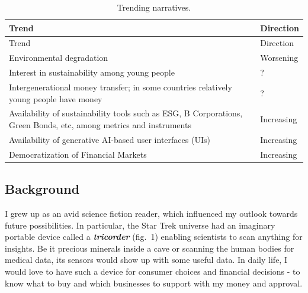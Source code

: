 \documentclass[
  12pt,
  letterpaper,
  DIV=11,
  numbers=noendperiod]{scrartcl}
\begin{document}
\begin{longtable}[]{@{}
  >{\raggedright\arraybackslash}p{}
  >{\raggedright\arraybackslash}p{}@{}}
\caption{Trending narratives.}\tabularnewline
\toprule\noalign{}
\begin{minipage}[b]{\linewidth}\raggedright
Trend
\end{minipage} & \begin{minipage}[b]{\linewidth}\raggedright
Direction
\end{minipage} \\
\midrule\noalign{}
\endfirsthead
\toprule\noalign{}
\begin{minipage}[b]{\linewidth}\raggedright
Trend
\end{minipage} & \begin{minipage}[b]{\linewidth}\raggedright
Direction
\end{minipage} \\
\midrule\noalign{}
\endhead
\bottomrule\noalign{}
\endlastfoot
Environmental degradation & Worsening \\
Interest in sustainability among young people & ? \\
Intergenerational money transfer; in some countries relatively young
people have money & ? \\
Availability of sustainability tools such as ESG, B Corporations, Green
Bonds, etc, among metrics and instruments & Increasing \\
Availability of generative AI-based user interfaces (UIs) &
Increasing \\
Democratization of Financial Markets & Increasing \\
\end{longtable}

\subsection{Background}\label{background}

I grew up as an avid science fiction reader, which influenced my outlook
towards future possibilities. In particular, the Star Trek universe had
an imaginary portable device called a \textbf{\emph{tricorder}} (fig.~1)
enabling scientists to scan anything for insights. Be it precious
minerals inside a cave or scanning the human bodies for medical data,
its sensors would show up with some useful data. In daily life, I would
love to have such a device for consumer choices and financial decisions
- to know what to buy and which businesses to support with my money and
approval.
\end{document}
